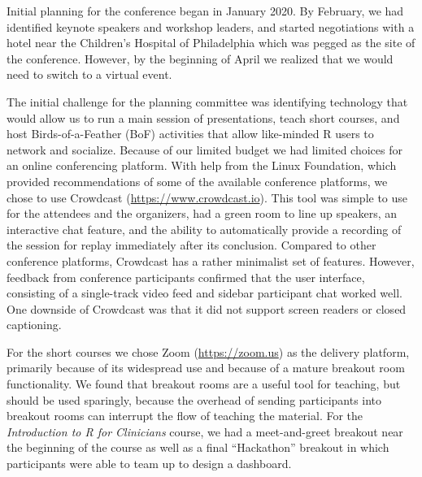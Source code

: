 Initial planning for the conference began in January 2020. By February, we had
identified keynote speakers and workshop leaders, and started negotiations with a hotel near
the Children's Hospital of Philadelphia which was
pegged as the site of the conference.
However, by the beginning of April we
realized that we would need to switch to a virtual event.

The initial
challenge for the planning committee was identifying
technology that would allow us to run a main session of presentations,
teach short courses, and host Birds-of-a-Feather (BoF)
activities that allow like-minded R users to network and socialize. Because of our limited budget we had
limited choices for an online conferencing platform. With help from the
Linux Foundation, which provided recommendations of some of the available conference
platforms, we chose to use Crowdcast (\url{https://www.crowdcast.io}).
This tool was simple to
use for the attendees and the organizers, had a green room to line up
speakers, an interactive chat feature, and the ability to automatically provide a recording of the session
for replay immediately after its conclusion. Compared to other conference platforms, Crowdcast has a rather minimalist set of features. However, feedback from conference participants confirmed
that the user interface, consisting of a single-track video feed and sidebar participant chat worked well. One downside of Crowdcast was that it did not support screen readers or closed captioning.

For the short courses we chose Zoom (\url{https://zoom.us}) as the delivery platform, primarily because of its widespread use and because of a mature breakout room functionality. We found that breakout rooms are a useful tool for teaching, but should be used sparingly, because the overhead of sending participants into breakout rooms can interrupt the flow of teaching the material. For the \emph{Introduction to R for Clinicians} course, we had a meet-and-greet breakout near the beginning of the course as well as a final ``Hackathon'' breakout in which participants were able to team up to design a dashboard.

